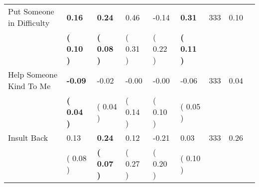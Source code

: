 \begin{tabular}{L{6.2cm} C{1.8cm} C{1.8cm} C{1.8cm} C{1.8cm} C{1.8cm} C{1.8cm} C{0.3cm} C{0.3cm}}
Put Someone in Difficulty & \textbf{     0.16} & \textbf{     0.24} &      0.46 &     -0.14 & \textbf{     0.31}  & 333 &       0.10 \\ 
 & \textbf{(     0.10 )} & \textbf{(     0.08 )} & (     0.31 ) & (     0.22 ) & \textbf{(     0.11 )}  & \\
Help Someone Kind To Me & \textbf{    -0.09} &     -0.02 &     -0.00 &     -0.00 &     -0.06  & 333 &       0.04 \\ 
 & \textbf{(     0.04 )} & (     0.04 ) & (     0.14 ) & (     0.10 ) & (     0.05 )  & \\
Insult Back &      0.13 & \textbf{     0.24} &      0.12 &     -0.21 &      0.03  & 333 &       0.26 \\ 
 & (     0.08 ) & \textbf{(     0.07 )} & (     0.27 ) & (     0.20 ) & (     0.10 )  & \\
\bottomrule
\end{tabular}
